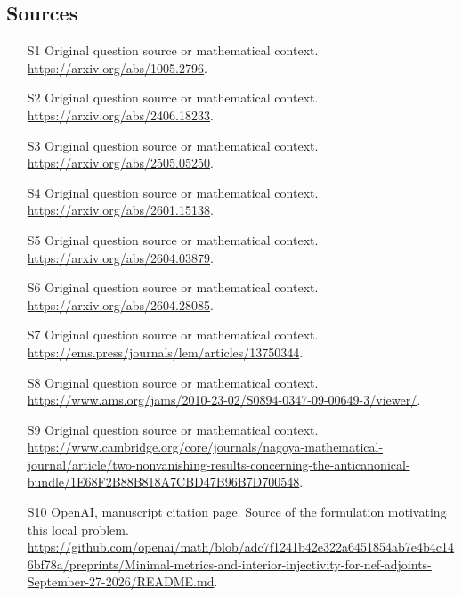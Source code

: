 \documentclass[11pt]{article}
\begin{document}
\subsection{Sources}
\begin{itemize}
\item[S1] Original question source or mathematical context.
\url{https://arxiv.org/abs/1005.2796}.
\item[S2] Original question source or mathematical context.
\url{https://arxiv.org/abs/2406.18233}.
\item[S3] Original question source or mathematical context.
\url{https://arxiv.org/abs/2505.05250}.
\item[S4] Original question source or mathematical context.
\url{https://arxiv.org/abs/2601.15138}.
\item[S5] Original question source or mathematical context.
\url{https://arxiv.org/abs/2604.03879}.
\item[S6] Original question source or mathematical context.
\url{https://arxiv.org/abs/2604.28085}.
\item[S7] Original question source or mathematical context.
\url{https://ems.press/journals/lem/articles/13750344}.
\item[S8] Original question source or mathematical context.
\url{https://www.ams.org/jams/2010-23-02/S0894-0347-09-00649-3/viewer/}.
\item[S9] Original question source or mathematical context.
\url{https://www.cambridge.org/core/journals/nagoya-mathematical-journal/article/two-nonvanishing-results-concerning-the-anticanonical-bundle/1E68F2B88B818A7CBD47B96B7D700548}.
\item[S10] OpenAI, manuscript citation page. Source of the formulation motivating this local problem.
\url{https://github.com/openai/math/blob/adc7f1241b42e322a6451854ab7e4b4c146bf78a/preprints/Minimal-metrics-and-interior-injectivity-for-nef-adjoints-September-27-2026/README.md}.
\end{itemize}
\end{document}
